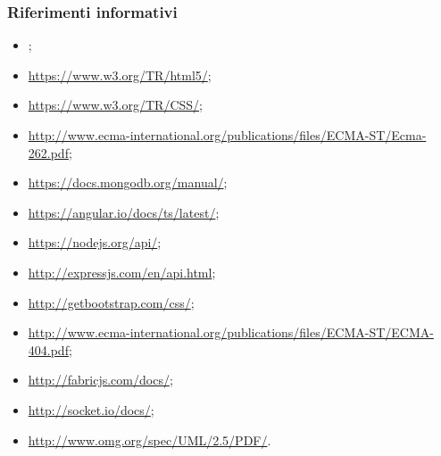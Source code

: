 \documentclass[a4paper, titlepage]{article}
\begin{document}
	\subsubsection{Riferimenti informativi}
	\begin{itemize}
		\item {} \Gldoc;
		
		\item {} \newline \url{https://www.w3.org/TR/html5/};
		
		\item {} \newline \url{https://www.w3.org/TR/CSS/};
		
		\item {} \newline \url{http://www.ecma-international.org/publications/files/ECMA-ST/Ecma-262.pdf};
		
		\item {} \newline \url{https://docs.mongodb.org/manual/};
		
		\item {} \newline \url{https://angular.io/docs/ts/latest/};
		
		\item {} \newline \url{https://nodejs.org/api/};
		
		\item {} \newline \url{http://expressjs.com/en/api.html};
		
		\item {} \newline \url{http://getbootstrap.com/css/};
		
		\item {} \newline \url{http://www.ecma-international.org/publications/files/ECMA-ST/ECMA-404.pdf};
		
		\item {} \newline \url{http://fabricjs.com/docs/};
		
		\item {} \newline \url{http://socket.io/docs/};
		
		\item {} \newline \url{http://www.omg.org/spec/UML/2.5/PDF/}.
		
	\end{itemize}
		
\end{document}

